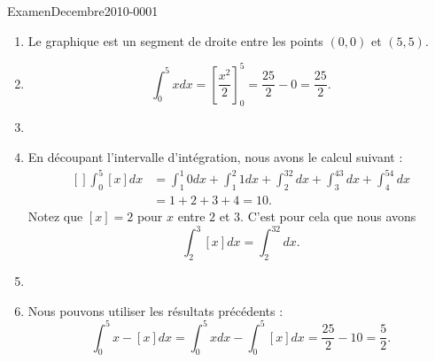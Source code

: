 
\begin{corrige}{ExamenDecembre2010-0001}

	\begin{enumerate}
		\item
			Le graphique est un segment de droite entre les points $(0,0)$ et $(5,5)$.
		\item
			\begin{equation}
				\int_0^5xdx=\left[ \frac{ x^2 }{2} \right]^5_0=\frac{ 25 }{2}-0=\frac{ 25 }{2}.
			\end{equation}
		\item
		\item
			En découpant l'intervalle d'intégration, nous avons le calcul suivant :
			\begin{equation}
				\begin{aligned}[]
					\int_0^5[x]dx&=\int_1^1 0dx+\int_1^2 1dx+\int_2^32dx+\int_3^43dx+\int_4^54dx\\
					&=1+2+3+4=10.
				\end{aligned}
			\end{equation}
			Notez que $[x]=2$ pour $x$ entre $2$ et $3$. C'est pour cela que nous avons
			\begin{equation}
				\int_2^3[x]dx=\int_2^32dx.
			\end{equation}
			
		\item
		\item
			Nous pouvons utiliser les résultats précédents :
			\begin{equation}
				\int_0^5x-[x]dx=\int_0^5xdx-\int_0^5[x]dx=\frac{ 25 }{ 2 }-10=\frac{ 5 }{2}.
			\end{equation}

	\end{enumerate}

\end{corrige}

